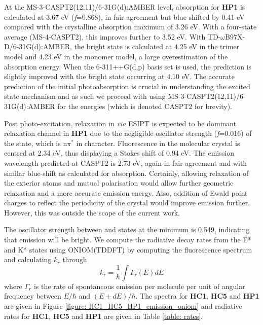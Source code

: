 At the MS-3-CASPT2(12,11)/6-31G(d):AMBER level, absorption for \textbf{HP1} is calculated at 3.67 eV (\textit{f}=0.868), in fair agreement but blue-shifted by 0.41 eV compared with the crystalline absorption maximum of 3.26 eV.\cite{Tang2016} 
With a four-state average (MS-4-CASPT2), this improves further to 3.52 eV. With TD-$\omega$B97X-D/6-31G(d):AMBER, the bright state is calculated at 4.25 eV in the trimer model and 4.23 eV in the monomer model, a large overestimation of the absorption energy. When the 6-311++G(d,p) basis set is used, the prediction is slightly improved with the bright state occurring at 4.10 eV. The accurate prediction of the initial photoabsorption is crucial in understanding the excited state mechanism and as such we proceed with using MS-3-CASPT2(12,11)/6-31G(d):AMBER for the energies (which is denoted CASPT2 for brevity). %

Post photo-excitation, relaxation in \sone{} \textit{via}  ESIPT is expected to be dominant relaxation channel in \textbf{HP1} due to the negligible oscillator strength (\textit{f}=0.016) of the \stwo{} state, which is n$\pi^\ast{}$ in character. Fluorescence in the molecular crystal is centred at 2.34 eV, thus displaying a Stokes shift of 0.94 eV. The emission wavelength predicted at CASPT2 is 2.73 eV, again in fair agreement and with similar blue-shift as calculated for absorption. Certainly, allowing relaxation of the exterior atoms and mutual polarisation would allow further geometric relaxation and a more accurate emission energy. Also, addition of Ewald point charges to reflect the periodicity of the crystal would improve emission further. However, this was outside the scope of the current work.

The oscillator strength between \sone{} and \szero{} states at the \Kstar{} minimum is 0.549, indicating that emission will be bright. We compute the radiative decay rates from the E* and K* states using ONIOM(TDDFT) by computing the fluorescence spectrum and calculating $k_{r}$ through
\begin{equation}
    k_{r}=\frac{1}{\hbar}\int{\Gamma_{r}(E)dE}
\end{equation}
where $\Gamma_{r}$ is the rate of spontaneous emission per molecule per unit of angular frequency between $E/\hbar$ and $(E+d
E)/\hbar$.\cite{Niu2010} The spectra for \textbf{HC1}, \textbf{HC5} and \textbf{HP1} are given in Figure \ref{figure: HC1_HC5_HP1_emission_oniom} and radiative rates for \textbf{HC1}, \textbf{HC5} and \textbf{HP1} are given in Table \ref{table: rates}.

